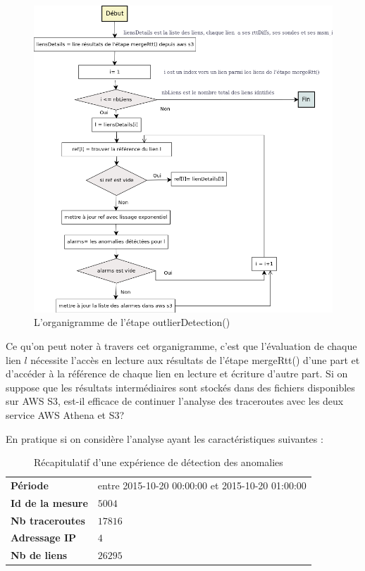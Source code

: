  \begin{figure}[H]
\centering
\includegraphics[width=1\linewidth]{illustrations/outlier_detection_organigramm}
\caption{L'organigramme de  l'étape outlierDetection()}
\label{fig:outlier_detection_organigramm}
\end{figure}

Ce qu'on peut noter à travers cet organigramme, c'est que l'évaluation de chaque lien $l$ nécessite l'accès en lecture aux résultats de l'étape mergeRtt()  d'une part et d'accéder à la référence de chaque lien  en lecture et écriture d'autre part. Si on suppose que les résultats intermédiaires sont stockés dans des fichiers disponibles sur AWS S3, est-il efficace de continuer l'analyse des traceroutes avec les deux service AWS Athena et S3?

En pratique si on considère l'analyse ayant les caractéristiques suivantes :
\begin{table}[H]
	\begin{tabular}{ll}
\textbf{Période} & entre 2015-10-20 00:00:00 et 2015-10-20 01:00:00\\ 
\textbf{Id de la mesure} &  $ 5004 $ \\
\textbf{Nb traceroutes} &  $ 17816 $\\
\textbf{Adressage IP} & $ 4 $ \\
\textbf{Nb de liens} &$ 26295 $\\
	\end{tabular}
	\caption{Récapitulatif d'une expérience de détection des anomalies }
	\label{tab:details-analyse}
\end{table}

